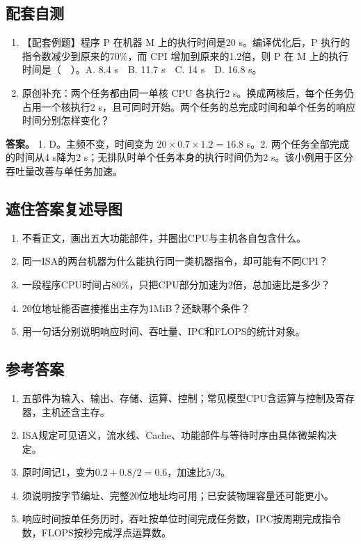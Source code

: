\subsection{配套自测}\label{CO01-11}

\begin{enumerate}
\def\labelenumi{\arabic{enumi}.}
\tightlist
\item
  【配套例题】程序 P 在机器 M 上的执行时间是20 s。编译优化后，P 执行的指令数减少到原来的70\%，而 CPI 增加到原来的1.2倍，则 P 在 M 上的执行时间是（　）。A. 8.4 s　B. 11.7 s　C. 14 s　D. 16.8 s。
\item
  原创补充：两个任务都由同一单核 CPU 各执行2 s。换成两核后，每个任务仍占用一个核执行2 s，且可同时开始。两个任务的总完成时间和单个任务的响应时间分别怎样变化？
\end{enumerate}

\textbf{答案。} 1. D。主频不变，时间变为 \(20\times0.7\times1.2=16.8\) s。2. 两个任务全部完成的时间从4 s降为2 s；无排队时单个任务本身的执行时间仍为2 s。该小例用于区分吞吐量改善与单任务加速。

\subsection{遮住答案复述导图}\label{CO01-recall-new}

\begin{recallcard}[主动回忆·自拟]

\begin{enumerate}
\def\labelenumi{\arabic{enumi}.}
\tightlist
\item
  不看正文，画出五大功能部件，并圈出CPU与主机各自包含什么。
\item
  同一ISA的两台机器为什么能执行同一类机器指令，却可能有不同CPI？
\item
  一段程序CPU时间占80\%，只把CPU部分加速为2倍，总加速比是多少？
\item
  20位地址能否直接推出主存为1MiB？还缺哪个条件？
\item
  用一句话分别说明响应时间、吞吐量、IPC和FLOPS的统计对象。
\end{enumerate}

\end{recallcard}

\subsection{参考答案}\label{CO01-answers}

\begin{enumerate}
\def\labelenumi{\arabic{enumi}.}
\tightlist
\item
  五部件为输入、输出、存储、运算、控制；常见模型CPU含运算与控制及寄存器，主机还含主存。
\item
  ISA规定可见语义，流水线、Cache、功能部件与等待时序由具体微架构决定。
\item
  原时间记1，变为\(0.2+0.8/2=0.6\)，加速比\(5/3\)。
\item
  须说明按字节编址、完整20位地址均可用；已安装物理容量还可能更小。
\item
  响应时间按单任务历时，吞吐按单位时间完成任务数，IPC按周期完成指令数，FLOPS按秒完成浮点运算数。
\end{enumerate}
